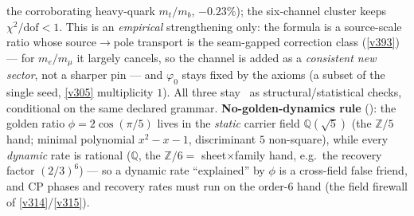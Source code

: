 \documentclass[11pt,a4paper]{article}
\providecommand{\Z}{\mathbb{Z}}
\begin{document}
\begin{winbox}
the corroborating heavy-quark $m_t/m_b$, $-0.23\%$); the six-channel cluster keeps $\chi^2/\mathrm{dof}{<}1$. This is an \emph{empirical} strengthening only: the formula is a source-scale ratio whose source$\to$pole transport is the seam-gapped correction class (\vref{v393}) --- for $m_e/m_\mu$ it largely cancels, so the channel is added as a \emph{consistent new sector}, not a sharper pin --- and $\varphi_0$ stays fixed by the axioms (a subset of the single seed, \vref{v305} multiplicity $1$). All three stay \mE\ as structural/statistical checks, conditional on the same declared grammar.
\textbf{No-golden-dynamics rule} (): the golden ratio $\phi=2\cos(\pi/5)$ lives in the \emph{static} carrier field $\mathbb Q(\sqrt5)$ (the $\Z/5$ hand; minimal polynomial $x^2-x-1$, discriminant $5$ non-square), while every \emph{dynamic} rate is rational ($\mathbb Q$, the $\Z/6=$ sheet$\times$family hand, e.g.\ the recovery factor $(2/3)^6$) --- so a dynamic rate ``explained'' by $\phi$ is a cross-field false friend, and CP phases and recovery rates must run on the order-$6$ hand (the field firewall of \vref{v314}/\vref{v315}).
\end{winbox}
\end{document}
